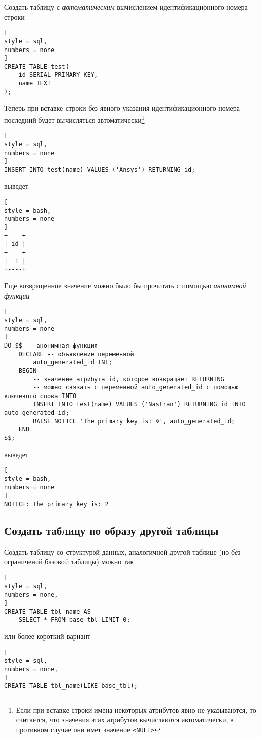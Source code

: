 \documentclass[%
	11pt,
	a4paper,
	utf8,
		]{article}
\begin{document}
Создать таблицу с \emph{автоматическим} вычислением идентификационного номера строки
\begin{lstlisting}[
style = sql,
numbers = none
]
CREATE TABLE test(
    id SERIAL PRIMARY KEY,
    name TEXT
);
\end{lstlisting}

Теперь при вставке строки без явного указания идентификационного номера последний будет вычисляться автоматически\footnote{Если при вставке строки имена некоторых атрибутов явно не указываются, то считается, что значения этих атрибутов вычисляются автоматически, в противном случае они имет значение \texttt{<NULL>}}
\begin{lstlisting}[
style = sql,
numbers = none
]
INSERT INTO test(name) VALUES ('Ansys') RETURNING id;
\end{lstlisting}
выведет
\begin{lstlisting}[
style = bash,
numbers = none
]
+----+
| id |
+----+
|  1 |
+----+
\end{lstlisting}

Еще возвращенное значение можно было бы прочитать с помощью \emph{анонимной функции}
\begin{lstlisting}[
style = sql,
numbers = none
]
DO $$ -- анонимная функция
    DECLARE -- объявление переменной
        auto_generated_id INT;
    BEGIN
        -- значение атрибута id, которое возвращает RETURNING
        -- можно связать с переменной auto_generated_id с помощью ключевого слова INTO
        INSERT INTO test(name) VALUES ('Nastran') RETURNING id INTO auto_generated_id;
        RAISE NOTICE 'The primary key is: %', auto_generated_id;
    END
$$;
\end{lstlisting}
выведет
\begin{lstlisting}[
style = bash,
numbers = none
]
NOTICE: The primary key is: 2
\end{lstlisting}



\subsection{Создать таблицу по образу другой таблицы}

Создать таблицу со структурой данных, аналогичной другой таблице (но \emph{без} ограничений базовой таблицы) можно так
\begin{lstlisting}[
style = sql,
numbers = none,
]
CREATE TABLE tbl_name AS
    SELECT * FROM base_tbl LIMIT 0;
\end{lstlisting}  
или более короткий вариант
\begin{lstlisting}[
style = sql,
numbers = none,
]
CREATE TABLE tbl_name(LIKE base_tbl);
\end{lstlisting}
\end{document}
